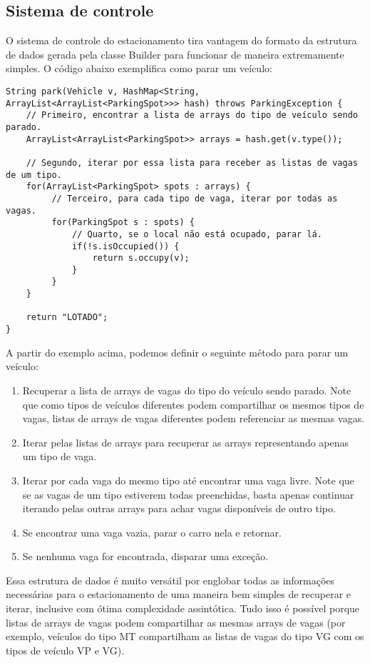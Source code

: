 \documentclass{article}
\begin{document}
\subsection{Sistema de controle}
O sistema de controle do estacionamento tira vantagem do formato da estrutura de dados gerada pela classe Builder para funcionar de maneira extremamente simples. O código abaixo exemplifica como parar um veículo:

\begin{lstlisting}
String park(Vehicle v, HashMap<String, ArrayList<ArrayList<ParkingSpot>>> hash) throws ParkingException {
    // Primeiro, encontrar a lista de arrays do tipo de veículo sendo parado.
    ArrayList<ArrayList<ParkingSpot>> arrays = hash.get(v.type());

    // Segundo, iterar por essa lista para receber as listas de vagas de um tipo.
    for(ArrayList<ParkingSpot> spots : arrays) {
         // Terceiro, para cada tipo de vaga, iterar por todas as vagas.
         for(ParkingSpot s : spots) {
             // Quarto, se o local não está ocupado, parar lá.
             if(!s.isOccupied()) {
                 return s.occupy(v);
             }
         }
    }

    return "LOTADO";
}
\end{lstlisting}

A partir do exemplo acima, podemos definir o seguinte método para parar um veículo:
\begin{enumerate}
    \item Recuperar a lista de arrays de vagas do tipo do veículo sendo parado. Note que como tipos de veículos diferentes podem compartilhar os mesmos tipos de vagas, listas de arrays de vagas diferentes podem referenciar as mesmas vagas.
    \item Iterar pelas listas de arrays para recuperar as arrays representando apenas um tipo de vaga.
    \item Iterar por cada vaga do mesmo tipo até encontrar uma vaga livre. Note que se as vagas de um tipo estiverem todas preenchidas, basta apenas continuar iterando pelas outras arrays para achar vagas disponíveis de outro tipo.
    \item Se encontrar uma vaga vazia, parar o carro nela e retornar.
    \item Se nenhuma vaga for encontrada, disparar uma exceção.
\end{enumerate}

Essa estrutura de dados é muito versátil por englobar todas as informações necessárias para o estacionamento de uma maneira bem simples de recuperar e iterar, inclusive com ótima complexidade assintótica. Tudo isso é possível porque listas de arrays de vagas podem compartilhar as mesmas arrays de vagas (por exemplo, veículos do tipo MT compartilham as listas de vagas do tipo VG com os tipos de veículo VP e VG).
\end{document}
